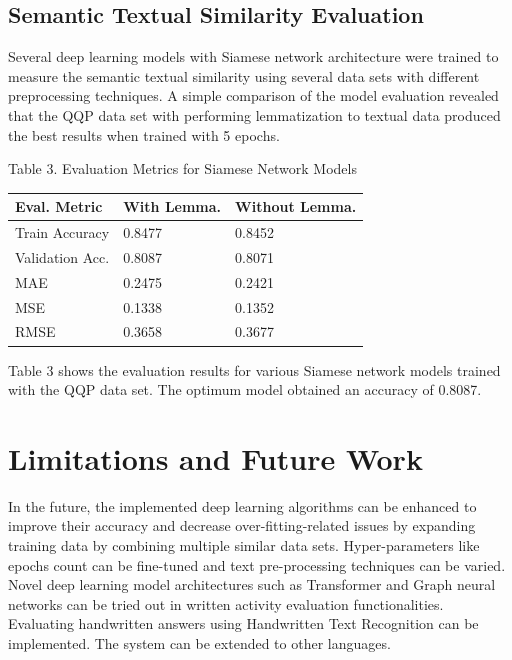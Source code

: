 \documentclass[conference]{IEEEtran}
\begin{document}
\subsection{Semantic Textual Similarity Evaluation}

Several deep learning models with Siamese network architecture were trained to measure the semantic textual similarity using several data sets with different preprocessing techniques. A simple comparison of the model evaluation revealed that the QQP data set with performing lemmatization to textual data produced the best results when trained with 5 epochs.

\begin{center}
\scriptsize
Table 3. Evaluation Metrics for Siamese Network Models
\linebreak
\linebreak
\scriptsize
\begin{tabular}{ | m{7em} | m{7em} | m{7em} | }
\hline
\raggedright
Eval. Metric & With Lemma. & Without Lemma. \\
\hline
\raggedright
Train Accuracy & 0.8477 & 0.8452 \\
\hline
\raggedright
Validation Acc. & 0.8087 & 0.8071 \\
\hline
\raggedright
MAE & 0.2475 & 0.2421 \\
\hline
\raggedright
MSE & 0.1338 & 0.1352 \\
\hline
\raggedright
RMSE & 0.3658 & 0.3677 \\
\hline
\end{tabular}
\linebreak
\end{center}

Table 3 shows the evaluation results for various Siamese network models trained with the QQP data set. The optimum model obtained an accuracy of 0.8087.

\section{Limitations and Future Work}

In the future, the implemented deep learning algorithms can be enhanced to improve their accuracy and decrease over-fitting-related issues by expanding training data by combining multiple similar data sets. Hyper-parameters like epochs count can be fine-tuned and text pre-processing techniques can be varied. Novel deep learning model architectures such as Transformer and Graph neural networks can be tried out in written activity evaluation functionalities. Evaluating handwritten answers using Handwritten Text Recognition can be implemented. The system can be extended to other languages.
\end{document}
